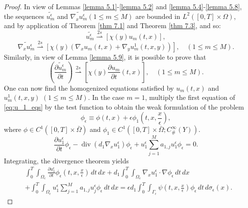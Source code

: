 \begin{proof}
In view of Lemmas \eqref{lemma 5.1}-\eqref{lemma 5.2} and \eqref{lemma 5.4}-\eqref{lemma 5.8}, the sequences $\widetilde{u_{m}^{\epsilon}}$ and $\widetilde{\nabla_{x} u_{m}^{\epsilon}}(1 \leq m \leq M)$ are bounded in $L^{2}([0, T] \times \Omega)$, and by application of Theorem \eqref{thm 7.1} and Theorem \eqref{thm 7.3}, and so:
\begin{equation}
\widetilde{u_{m}^{\epsilon}}  \overset{2s}{\rightharpoonup}
\left[\chi(y) u_{m}(t, x)\right],
\end{equation}
\begin{equation}
\widetilde{\nabla_{x} u_{m}^{\epsilon}}
\overset{2s}{\rightharpoonup}
\left[\chi(y)\left(\nabla_{x} u_{m}(t, x)+\right.\right.\left.\left.\nabla_{y} u_{m}^{1}(t, x, y)\right)\right], \quad (1 \leq m \leq M).
\end{equation}
Similarly, in view of Lemma \eqref{lemma 5.9}, it is possible to prove that
\begin{equation}
\left(\widetilde{\frac{\partial u_{m}^{\epsilon}}{\partial t}}\right)
\overset{2s}{\rightharpoonup}
\left[\chi(y) \frac{\partial u_{m}}{\partial t}(t, x)\right],  \quad (1 \leq m \leq M).
\end{equation}
One can now find the homogenized equations satisfied by $u_{m}(t, x)$ and $u_{m}^{1}(t, x, y)$ $(1 \leq m \leq M)$.
In the case $m=1$, multiply the first equation of \eqref{eq:u_1_eqs} by the test function to obtain the weak formulation of the problem
$$
\phi_{\epsilon} \equiv \phi(t, x)+\epsilon \phi_{1}\left(t, x, \frac{x}{\epsilon}\right),
$$
where $\phi \in C^{1}([0, T] \times \bar{\Omega})$ and $\phi_{1} \in C^{1}\left([0, T] \times \bar{\Omega} ; C_{\#}^{\infty}(Y)\right)$. 
\begin{equation*}
    \frac{\partial u_{1}^{\epsilon}}{\partial t}\phi_{\epsilon}-\operatorname{div}\left(d_{1} \nabla_{x} u_{1}^{\epsilon}\right)\phi_{\epsilon}+u_{1}^{\epsilon} \sum_{j=1}^{M} a_{1, j} u_{1}^{\epsilon}\phi_{\epsilon}=0.
\end{equation*}
Integrating, the divergence theorem yields
\begin{equation}
  \begin{aligned}
&\int_{0}^{T} \int_{\Omega_{\epsilon}} \frac{\partial u_{1}^{\epsilon}}{\partial t} \phi_{\epsilon}\left(t, x, \frac{x}{\epsilon}\right) \, d  t \, d  x+d_{1} \int_{0}^{T} \int_{\Omega_{\epsilon}} \nabla_{x} u_{1}^{\epsilon} \cdot \nabla \phi_{\epsilon} \, d  t \, d  x \\
&+\int_{0}^{T} \int_{\Omega_{\epsilon}} u_{1}^{\epsilon} \sum_{j=1}^{M} a_{1, j} u_{j}^{\epsilon} \phi_{\epsilon} \, d  t \, d  x=\epsilon d_{1} \int_{0}^{T} \int_{\Gamma_{\epsilon}} \psi\left(t, x, \frac{x}{\epsilon}\right) \phi_{\epsilon} \, d  t \, d  \sigma_{\epsilon}(x).

\end{aligned}
\end{equation}
\end{proof}
